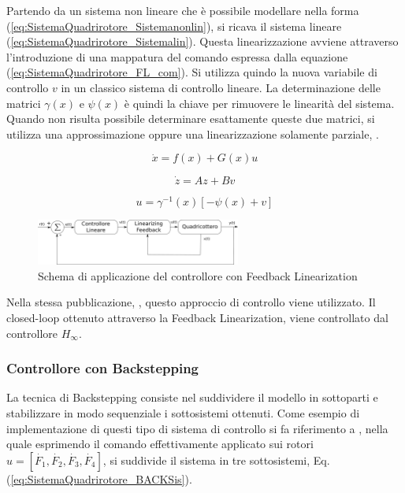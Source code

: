 Partendo da un sistema non lineare che è possibile modellare nella forma (\ref{eq:SistemaQuadrirotore_Sistemanonlin}), si ricava il sistema lineare (\ref{eq:SistemaQuadrirotore_Sistemalin}). Questa linearizzazione avviene attraverso l'introduzione di una mappatura del comando espressa dalla equazione (\ref{eq:SistemaQuadrirotore_FL_com}). Si utilizza quindo la nuova variabile di controllo $v$ in un classico sistema di controllo lineare. La determinazione delle matrici $\gamma(x)$ e $\psi(x)$ è quindi la chiave per rimuovere le linearità del sistema. Quando non risulta possibile determinare esattamente queste due matrici, si utilizza una approssimazione oppure una linearizzazione solamente parziale, \cite{IsidoriA2003NCS}.

\begin{equation}\label{eq:SistemaQuadrirotore_Sistemanonlin}
	\dot{x} = f(x) + G(x) u
\end{equation}

\begin{equation}\label{eq:SistemaQuadrirotore_Sistemalin}
	\dot{z} = A z + B v
\end{equation}

\begin{equation}\label{eq:SistemaQuadrirotore_FL_com}
	u = \gamma^{-1}(x) \left[- \psi(x)+v\right]
\end{equation}

\begin{figure}
	\centering
	\includegraphics[width=0.6\textwidth]{SistemaQuadrirotore/Figure/FLP}
	\caption{Schema di applicazione del controllore con Feedback Linearization}
\end{figure}

Nella stessa pubblicazione, \cite{G_inf}, questo approccio di controllo viene utilizzato. Il closed-loop ottenuto attraverso la Feedback Linearization, viene controllato dal controllore $H_\infty$.

\subsubsection{Controllore con Backstepping}
La tecnica di Backstepping consiste nel suddividere il modello in sottoparti e stabilizzare in modo sequenziale i sottosistemi ottenuti.
Come esempio di implementazione di questi tipo di sistema di controllo si fa riferimento a \cite{Backstepping}, nella quale esprimendo il comando effettivamente applicato sui rotori $u = \left[\dot{F_1} ,\dot{F_2}, \dot{F_3},\dot{F_4} \right]$, si suddivide il sistema in tre sottosistemi, Eq. (\ref{eq:SistemaQuadrirotore_BACKSis}).

